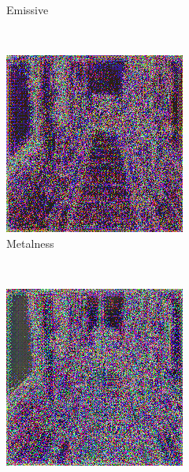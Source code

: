 \begin{figure}[h!]
\begin{subfigure}[b]{0.175\textwidth}
     \caption{Emissive}\label{subfig:1}
    \end{subfigure}
    ~
    \begin{subfigure}[b]{0.175\textwidth}
     \includegraphics[width=\textwidth]{figures/result/quadruple/depth_albedo_normal_metalness/2.png}
     \caption{Metalness}
    \end{subfigure}
    ~
    \begin{subfigure}[b]{0.175\textwidth}
     \includegraphics[width=\textwidth]{figures/result/quadruple/depth_albedo_normal_position/2.png}

\end{subfigure}
\end{figure}
